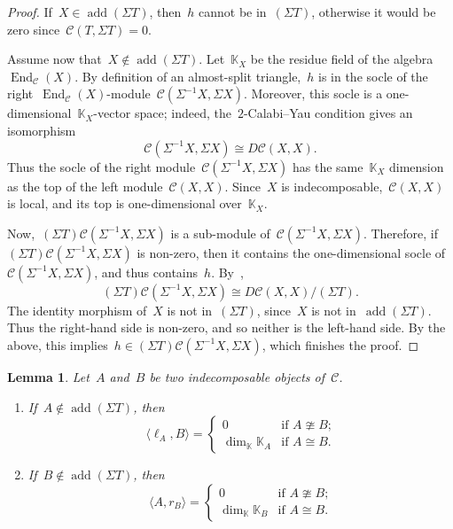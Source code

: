 \documentclass{amsart}
\newtheorem{lemma}[theorem]{Lemma}
\theoremstyle{definition}
\newcommand{\field}{\mathbb{K}}
\newcommand{\cat}{\mathcal{C}}
\newcommand{\susp}{\Sigma}
\newcommand{\add}{\operatorname{add}}
\newcommand{\End}[1]{\operatorname{End}_{#1}}
\begin{document}
\begin{proof}
If~$X \in \add(\susp T)$, then~$h$ cannot be in~$(\susp T)$, otherwise it would be zero since~$\cat(T, \susp T) =0$. 
 
Assume now that~$X\notin \add(\susp T)$. Let~$\field_X$ be the residue field of the algebra~$\End{\cat}(X)$. 
By definition of an almost-split triangle,~$h$ is in the socle of the right~$\End{\cat}(X)$-module~$\cat(\susp^{-1} X, \susp X)$. Moreover, this socle is a one-dimensional~$\field_X$-vector space; indeed, the~$2$-Calabi--Yau condition gives an isomorphism
\[
\cat(\susp^{-1} X, \susp X) \cong D\cat(X, X).
\]
Thus the socle of the right module~$\cat(\susp^{-1} X, \susp X)$ has the same~$\field_X$ dimension as the top of the left module~$\cat(X,X)$. Since~$X$ is indecomposable,~$\cat(X,X)$ is local, and its top is one-dimensional over~$\field_X$.
 
Now,~$(\susp T)\cat(\susp^{-1} X, \susp X)$ is a sub-module of~$\cat(\susp^{-1} X, \susp X)$. Therefore, if~$(\susp T)\cat(\susp^{-1} X, \susp X)$ is non-zero, then it contains the one-dimensional socle of~$\cat(\susp^{-1} X, \susp X)$, and thus contains~$h$.  
By~\cite{Palu},
\[
(\susp T)\cat(\susp^{-1} X, \susp X) \cong D\cat(X, X)/(\susp T). 
\]
The identity morphism of~$X$ is not in~$(\susp T)$, since~$X$ is not in~$\add(\susp T)$. Thus the right-hand side is non-zero, and so neither is the left-hand side. By the above, this implies~${h \in (\susp T)\cat(\susp^{-1} X, \susp X)}$, which finishes the proof.
\end{proof}

\begin{lemma}
\label{lem:bilinear-form}
Let~$A$ and~$B$ be two indecomposable objects of~$\cat$.
\begin{enumerate}
\item If~$A \notin \add(\susp T)$, then
\[
\langle \ell_A, B \rangle = 
\begin{cases}
0 & \textrm{if~$A\ncong B$;} \\
\dim_{\field}\field_A & \textrm{if~$A\cong B$.}
\end{cases}
\]
 
\item If~$B \notin \add(\susp T)$, then
\[
\langle A, r_B \rangle =
\begin{cases}
0 & \textrm{if~$A\ncong B$;} \\
\dim_{\field}\field_B & \textrm{if~$A\cong B$.}
\end{cases}
\]
\end{enumerate} 
\end{lemma}
\end{document}
